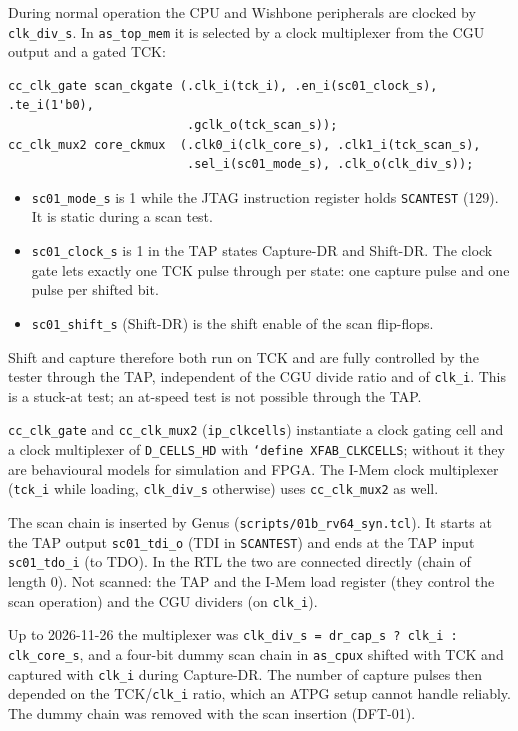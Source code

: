 During normal operation the CPU and Wishbone peripherals are clocked by
\texttt{clk\_div\_s}. In \texttt{as\_top\_mem} it is selected by a clock
multiplexer from the CGU output and a gated TCK:
\begin{verbatim}
cc_clk_gate scan_ckgate (.clk_i(tck_i), .en_i(sc01_clock_s), .te_i(1'b0),
                         .gclk_o(tck_scan_s));
cc_clk_mux2 core_ckmux  (.clk0_i(clk_core_s), .clk1_i(tck_scan_s),
                         .sel_i(sc01_mode_s), .clk_o(clk_div_s));
\end{verbatim}
\begin{itemize}
  \item \texttt{sc01\_mode\_s} is 1 while the JTAG instruction register holds
    \texttt{SCANTEST} (129). It is static during a scan test.
  \item \texttt{sc01\_clock\_s} is 1 in the TAP states Capture-DR and
    Shift-DR. The clock gate lets exactly one TCK pulse through per state:
    one capture pulse and one pulse per shifted bit.
  \item \texttt{sc01\_shift\_s} (Shift-DR) is the shift enable of the scan
    flip-flops.
\end{itemize}
Shift and capture therefore both run on TCK and are fully controlled by the
tester through the TAP, independent of the CGU divide ratio and of
\texttt{clk\_i}. This is a stuck-at test; an at-speed test is not possible
through the TAP.

\texttt{cc\_clk\_gate} and \texttt{cc\_clk\_mux2} (\texttt{ip\_clkcells})
instantiate a clock gating cell and a clock multiplexer of
\texttt{D\_CELLS\_HD} with \texttt{`define XFAB\_CLKCELLS}; without it they are
behavioural models for simulation and FPGA. The I-Mem clock multiplexer
(\texttt{tck\_i} while loading, \texttt{clk\_div\_s} otherwise) uses
\texttt{cc\_clk\_mux2} as well.

The scan chain is inserted by Genus (\texttt{scripts/01b\_rv64\_syn.tcl}). It
starts at the TAP output \texttt{sc01\_tdi\_o} (TDI in \texttt{SCANTEST}) and
ends at the TAP input \texttt{sc01\_tdo\_i} (to TDO). In the RTL the two are
connected directly (chain of length 0). Not scanned: the TAP and the I-Mem
load register (they control the scan operation) and the CGU dividers (on
\texttt{clk\_i}).

Up to 2026-11-26 the multiplexer was \texttt{clk\_div\_s = dr\_cap\_s ? clk\_i
: clk\_core\_s}, and a four-bit dummy scan chain in \texttt{as\_cpux} shifted
with TCK and captured with \texttt{clk\_i} during Capture-DR. The number of
capture pulses then depended on the TCK/\texttt{clk\_i} ratio, which an ATPG
setup cannot handle reliably. The dummy chain was removed with the scan
insertion (DFT-01).


